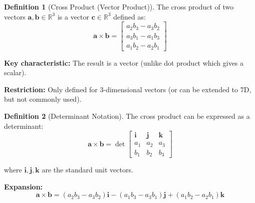 \documentclass[12pt,a4paper]{article}
\theoremstyle{definition}
\newtheorem{definition}{Definition}[section]
\begin{document}
\begin{definition}[Cross Product (Vector Product)]
The cross product of two vectors $\mathbf{a}, \mathbf{b} \in \mathbb{R}^3$ is a vector $\mathbf{c} \in \mathbb{R}^3$ defined as:
\begin{equation}
\mathbf{a} \times \mathbf{b} = \begin{bmatrix}
a_2b_3 - a_3b_2 \\
a_3b_1 - a_1b_3 \\
a_1b_2 - a_2b_1
\end{bmatrix}
\end{equation}

\textbf{Key characteristic:} The result is a vector (unlike dot product which gives a scalar).

\textbf{Restriction:} Only defined for 3-dimensional vectors (or can be extended to 7D, but not commonly used).
\end{definition}

\begin{definition}[Determinant Notation]
The cross product can be expressed as a determinant:
\begin{equation}
\mathbf{a} \times \mathbf{b} = \det\begin{bmatrix}
\mathbf{i} & \mathbf{j} & \mathbf{k} \\
a_1 & a_2 & a_3 \\
b_1 & b_2 & b_3
\end{bmatrix}
\end{equation}

where $\mathbf{i}, \mathbf{j}, \mathbf{k}$ are the standard unit vectors.

\textbf{Expansion:}
\begin{equation}
\mathbf{a} \times \mathbf{b} = (a_2b_3 - a_3b_2)\mathbf{i} - (a_1b_3 - a_3b_1)\mathbf{j} + (a_1b_2 - a_2b_1)\mathbf{k}
\end{equation}
\end{definition}
\end{document}
